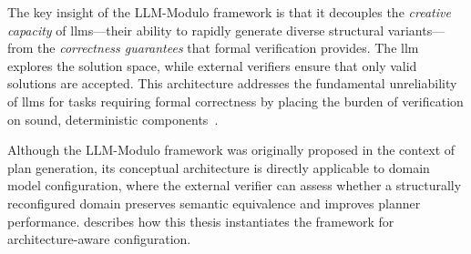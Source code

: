 The key insight of the LLM-Modulo framework is that it decouples the \emph{creative capacity} of \glspl{llm}---their ability to rapidly generate diverse structural variants---from the \emph{correctness guarantees} that formal verification provides.
The \gls{llm} explores the solution space, while external verifiers ensure that only valid solutions are accepted.
This architecture addresses the fundamental unreliability of \glspl{llm} for tasks requiring formal correctness by placing the burden of verification on sound, deterministic components~\cite{Kambhampati2024}.

Although the LLM-Modulo framework was originally proposed in the context of plan generation, its conceptual architecture is directly applicable to domain model configuration, where the external verifier can assess whether a structurally reconfigured domain preserves semantic equivalence and improves planner performance.
 describes how this thesis instantiates the framework for architecture-aware configuration.
